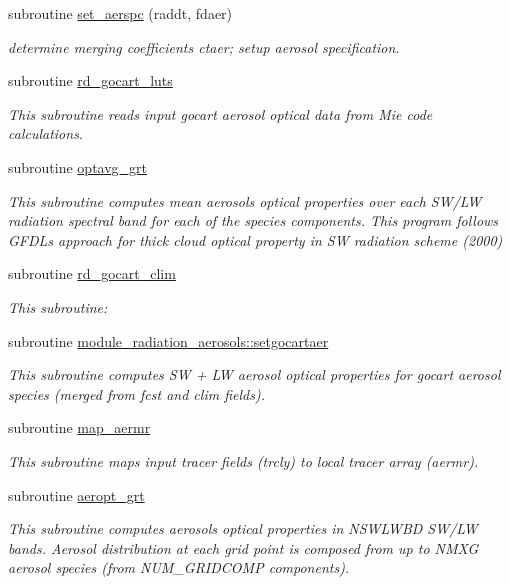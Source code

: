 \begin{DoxyCompactItemize}
subroutine \hyperlink{zhang__orig_2radiation__aerosols_8f_afb13b833ac59cf949702bdbde93d2c44}{set\+\_\+aerspc} (raddt, fdaer)
\begin{DoxyCompactList}\small\item\em determine merging coefficients ctaer; setup aerosol specification. \end{DoxyCompactList}\item 
subroutine \hyperlink{zhang__orig_2radiation__aerosols_8f_a8b6a882f91674d1c0f7f71f297a5f92e}{rd\+\_\+gocart\+\_\+luts}
\begin{DoxyCompactList}\small\item\em This subroutine reads input gocart aerosol optical data from Mie code calculations. \end{DoxyCompactList}\item 
subroutine \hyperlink{zhang__orig_2radiation__aerosols_8f_a8d1f5010e8cbc6abda50b8fc233ad7e9}{optavg\+\_\+grt}
\begin{DoxyCompactList}\small\item\em This subroutine computes mean aerosols optical properties over each S\+W/\+LW radiation spectral band for each of the species components. This program follows G\+F\+DL\textquotesingle{}s approach for thick cloud optical property in SW radiation scheme (2000) \end{DoxyCompactList}\item 
subroutine \hyperlink{zhang__orig_2radiation__aerosols_8f_a15bad8499ffd17d967e5788cd6721c4d}{rd\+\_\+gocart\+\_\+clim}
\begin{DoxyCompactList}\small\item\em This subroutine\+: \end{DoxyCompactList}\item 
subroutine \hyperlink{group__module__radiation__aerosols_ga685dc5ac4b7da2a375800bef712cbb8b}{module\+\_\+radiation\+\_\+aerosols\+::setgocartaer}
\begin{DoxyCompactList}\small\item\em This subroutine computes SW + LW aerosol optical properties for gocart aerosol species (merged from fcst and clim fields). \end{DoxyCompactList}\item 
subroutine \hyperlink{zhang__orig_2radiation__aerosols_8f_a651c4be2fa354238990c5c7b9488e9fd}{map\+\_\+aermr}
\begin{DoxyCompactList}\small\item\em This subroutine maps input tracer fields (trcly) to local tracer array (aermr). \end{DoxyCompactList}\item 
subroutine \hyperlink{zhang__orig_2radiation__aerosols_8f_a4ff866c545425e7029a11999e97d8faa}{aeropt\+\_\+grt}
\begin{DoxyCompactList}\small\item\em This subroutine computes aerosols optical properties in N\+S\+W\+L\+W\+BD S\+W/\+LW bands. Aerosol distribution at each grid point is composed from up to N\+M\+XG aerosol species (from N\+U\+M\+\_\+\+G\+R\+I\+D\+C\+O\+MP components). \end{DoxyCompactList}\end{DoxyCompactItemize}
